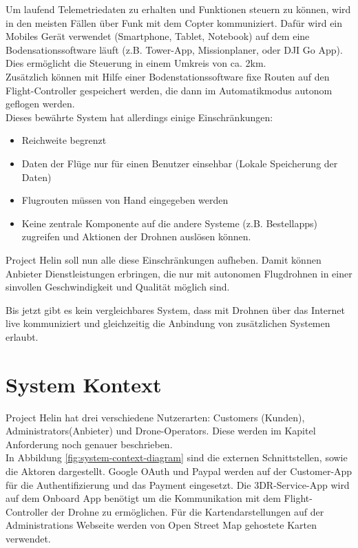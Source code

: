 Um laufend Telemetriedaten zu erhalten und Funktionen steuern zu können, wird in den meisten Fällen über Funk mit dem Copter kommuniziert. Dafür wird ein Mobiles Gerät verwendet (Smartphone, Tablet, Notebook) auf dem eine Bodensationssoftware läuft (z.B. Tower-App, Missionplaner, oder DJI Go App). Dies ermöglicht die Steuerung in einem Umkreis von ca. 2km.  \\

Zusätzlich können mit Hilfe einer Bodenstationssoftware fixe Routen auf den Flight-Controller gespeichert werden, die dann im Automatikmodus autonom geflogen werden.\\

Dieses bewährte System hat allerdings einige Einschränkungen: 

\begin{itemize}
	\item{Reichweite begrenzt}
	\item{Daten der Flüge nur für einen Benutzer einsehbar (Lokale Speicherung der Daten)}
	\item{Flugrouten müssen von Hand eingegeben werden}
	\item{Keine zentrale Komponente auf die andere Systeme (z.B. Bestellapps) zugreifen und Aktionen der Drohnen auslösen können.}
\end{itemize}

Project Helin soll nun alle diese Einschränkungen aufheben. Damit können Anbieter Dienstleistungen erbringen, die nur mit autonomen Flugdrohnen in einer sinvollen Geschwindigkeit und Qualität möglich sind.

Bis jetzt gibt es kein vergleichbares System, dass mit Drohnen über das Internet live kommuniziert und gleichzeitig die Anbindung von zusätzlichen Systemen erlaubt.

\section{System Kontext}

Project Helin hat drei verschiedene Nutzerarten: Customers (Kunden), Administrators(Anbieter) und Drone-Operators. Diese werden im Kapitel Anforderung noch genauer beschrieben.\\

In Abbildung \ref{fig:system-context-diagram} sind die externen Schnittstellen, sowie die Aktoren dargestellt. Google OAuth und Paypal werden auf der Customer-App für die Authentifizierung und das Payment eingesetzt. Die 3DR-Service-App wird auf dem Onboard App benötigt um die Kommunikation mit dem Flight-Controller der Drohne zu ermöglichen. Für die Kartendarstellungen auf der Administrations Webseite werden von Open Street Map gehostete Karten verwendet.


